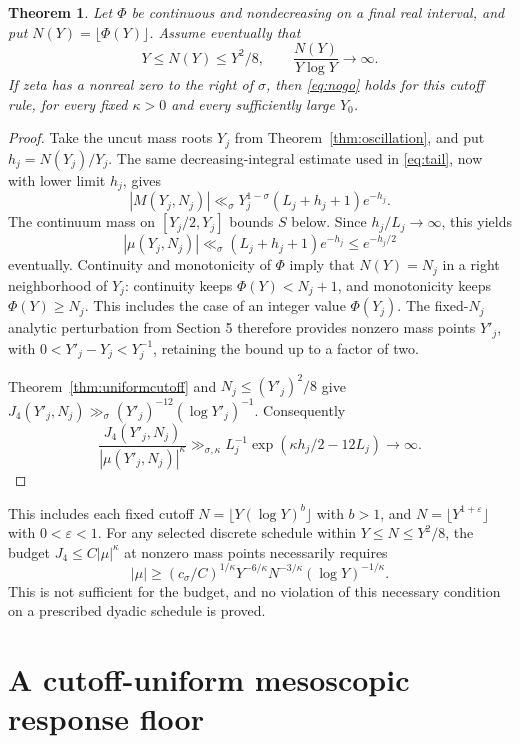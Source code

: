 \documentclass[11pt,a4paper]{article}
\newtheorem{theorem}{Theorem}[section]
\theoremstyle{definition}
\theoremstyle{remark}
\begin{document}
\begin{theorem}\label{thm:cutoffclass}
Let \(\Phi\) be continuous and nondecreasing on a final real
interval, and put \(N(Y)=\lfloor\Phi(Y)\rfloor\).
Assume eventually that
\[
 Y\le N(Y)\le Y^2/8,\qquad
 \frac{N(Y)}{Y\log Y}\longrightarrow\infty.
\]
If zeta has a nonreal zero to the right of \(\sigma\), then
\eqref{eq:nogo} holds for this cutoff rule, for every fixed
\(\kappa>0\) and every sufficiently large \(Y_0\).
\end{theorem}
\begin{proof}
Take the uncut mass roots \(Y_j\) from
Theorem~\ref{thm:oscillation}, and put \(h_j=N(Y_j)/Y_j\).
The same decreasing-integral estimate used in
\eqref{eq:tail}, now with lower limit \(h_j\), gives
\[
 |M(Y_j,N_j)|\ll_\sigma
 Y_j^{1-\sigma}(L_j+h_j+1)e^{-h_j}.
\]
The continuum mass on \([Y_j/2,Y_j]\) bounds \(S\) below.
Since \(h_j/L_j\to\infty\), this yields
\[
 |\mu(Y_j,N_j)|\ll_\sigma
 (L_j+h_j+1)e^{-h_j}\le e^{-h_j/2}
\]
eventually.
Continuity and monotonicity of \(\Phi\) imply that
\(N(Y)=N_j\) in a right neighborhood of \(Y_j\): continuity
keeps \(\Phi(Y)<N_j+1\), and monotonicity keeps
\(\Phi(Y)\ge N_j\).
This includes the case of an integer value \(\Phi(Y_j)\).
The fixed-\(N_j\) analytic perturbation from Section 5 therefore
provides nonzero mass points \(Y'_j\), with
\(0<Y'_j-Y_j<Y_j^{-1}\), retaining the bound up to a factor of two.

Theorem~\ref{thm:uniformcutoff} and \(N_j\le(Y'_j)^2/8\) give
\(J_4(Y'_j,N_j)\gg_\sigma(Y'_j)^{-12}(\log Y'_j)^{-1}\).
Consequently
\[
 \frac{J_4(Y'_j,N_j)}{|\mu(Y'_j,N_j)|^\kappa}
 \gg_{\sigma,\kappa}
 L_j^{-1}\exp(\kappa h_j/2-12L_j)\longrightarrow\infty.
\]
\end{proof}

This includes each fixed cutoff
\(N=\lfloor Y(\log Y)^b\rfloor\) with \(b>1\), and
\(N=\lfloor Y^{1+\varepsilon}\rfloor\) with \(0<\varepsilon<1\).
For any selected discrete schedule within \(Y\le N\le Y^2/8\),
the budget \(J_4\le C|\mu|^\kappa\) at nonzero mass points
necessarily requires
\[
 |\mu|\ge(c_\sigma/C)^{1/\kappa}
 Y^{-6/\kappa}N^{-3/\kappa}(\log Y)^{-1/\kappa}.
\]
This is not sufficient for the budget, and no violation of this
necessary condition on a prescribed dyadic schedule is proved.

\section{A cutoff-uniform mesoscopic response floor}
\end{document}
